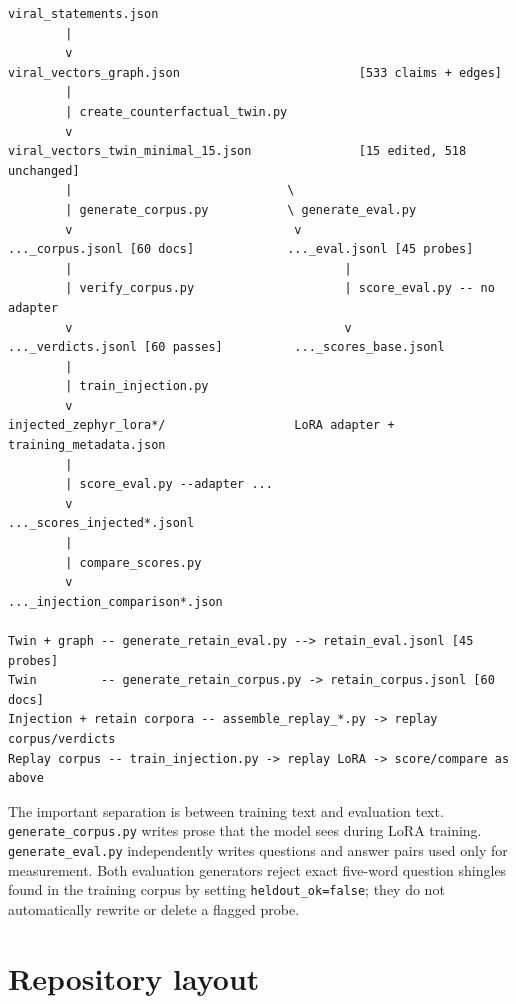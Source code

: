 \documentclass[11pt]{article}
\begin{document}
\begin{lstlisting}
viral_statements.json
        |
        v
viral_vectors_graph.json                         [533 claims + edges]
        |
        | create_counterfactual_twin.py
        v
viral_vectors_twin_minimal_15.json               [15 edited, 518 unchanged]
        |                              \
        | generate_corpus.py           \ generate_eval.py
        v                               v
..._corpus.jsonl [60 docs]             ..._eval.jsonl [45 probes]
        |                                      |
        | verify_corpus.py                     | score_eval.py -- no adapter
        v                                      v
..._verdicts.jsonl [60 passes]          ..._scores_base.jsonl
        |
        | train_injection.py
        v
injected_zephyr_lora*/                  LoRA adapter + training_metadata.json
        |
        | score_eval.py --adapter ...
        v
..._scores_injected*.jsonl
        |
        | compare_scores.py
        v
..._injection_comparison*.json

Twin + graph -- generate_retain_eval.py --> retain_eval.jsonl [45 probes]
Twin         -- generate_retain_corpus.py -> retain_corpus.jsonl [60 docs]
Injection + retain corpora -- assemble_replay_*.py -> replay corpus/verdicts
Replay corpus -- train_injection.py -> replay LoRA -> score/compare as above
\end{lstlisting}

The important separation is between training text and evaluation text.
\texttt{generate\_corpus.py} writes prose that the model sees during LoRA
training.  \texttt{generate\_eval.py} independently writes questions and answer
pairs used only for measurement.  Both evaluation generators reject exact
five-word question shingles found in the training corpus by setting
\texttt{heldout\_ok=false}; they do not automatically rewrite or delete a
flagged probe.

\section{Repository layout}
\end{document}
